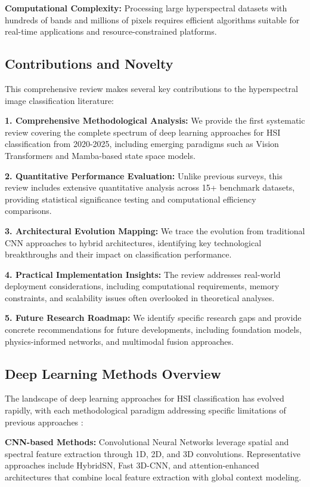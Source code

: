 \documentclass[journal]{IEEEtran}
\begin{document}
\textbf{Computational Complexity:} Processing large hyperspectral datasets with hundreds of bands and millions of pixels requires efficient algorithms suitable for real-time applications and resource-constrained platforms.

\subsection{Contributions and Novelty}

This comprehensive review makes several key contributions to the hyperspectral image classification literature:

\textbf{1. Comprehensive Methodological Analysis:} We provide the first systematic review covering the complete spectrum of deep learning approaches for HSI classification from 2020-2025, including emerging paradigms such as Vision Transformers and Mamba-based state space models.

\textbf{2. Quantitative Performance Evaluation:} Unlike previous surveys, this review includes extensive quantitative analysis across 15+ benchmark datasets, providing statistical significance testing and computational efficiency comparisons.

\textbf{3. Architectural Evolution Mapping:} We trace the evolution from traditional CNN approaches to hybrid architectures, identifying key technological breakthroughs and their impact on classification performance.

\textbf{4. Practical Implementation Insights:} The review addresses real-world deployment considerations, including computational requirements, memory constraints, and scalability issues often overlooked in theoretical analyses.

\textbf{5. Future Research Roadmap:} We identify specific research gaps and provide concrete recommendations for future developments, including foundation models, physics-informed networks, and multimodal fusion approaches.

\subsection{Deep Learning Methods Overview}

The landscape of deep learning approaches for HSI classification has evolved rapidly, with each methodological paradigm addressing specific limitations of previous approaches \cite{li2017deep}:

\textbf{CNN-based Methods:} Convolutional Neural Networks leverage spatial and spectral feature extraction through 1D, 2D, and 3D convolutions. Representative approaches include HybridSN, Fast 3D-CNN, and attention-enhanced architectures that combine local feature extraction with global context modeling.
\end{document}
